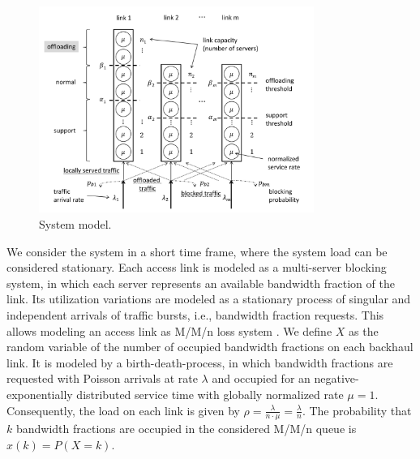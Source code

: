 \begin{figure}[tb]
	\centering
 	\includegraphics[width=0.8\textwidth]{aggregation/performance_model/figures/model_m}
  	\caption{System model.}
  	\label{fig:aggr:sysmodel}
\end{figure}


We consider the system in a short time frame, where the system load can be considered stationary.
Each access link is modeled as a multi-server blocking system, in which each server represents an available bandwidth fraction of the link.
Its utilization variations are modeled as a stationary process of singular and independent arrivals of traffic bursts, i.e., bandwidth fraction requests. This allows modeling an access link as M/M/n loss system \cite{kleinrock1975queuing}. We define $X$ as the random variable of the number of occupied bandwidth fractions on each backhaul link. It is modeled by a birth-death-process, in which bandwidth fractions are requested with Poisson arrivals at rate $\lambda$ and occupied for an negative-exponentially distributed service time with globally normalized rate $\mu=1$. Consequently, the load on each link is given by $\rho=\frac{\lambda}{n\cdot \mu}=\frac{\lambda}{n}$. The probability that $k$ bandwidth fractions are occupied in the considered M/M/n queue is $x(k)=P(X=k)$.


